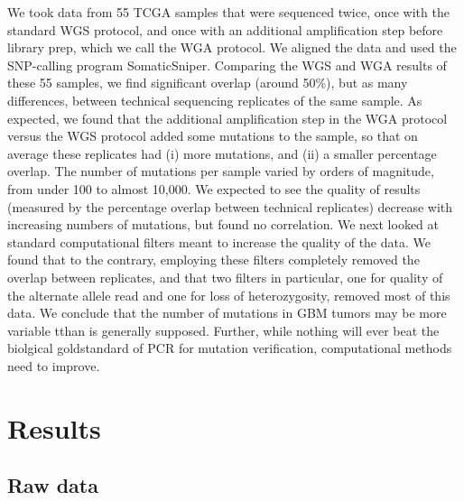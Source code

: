 \documentclass[11pt]{article} %
\begin{document}
We took data from 55 TCGA samples that were sequenced twice, once with the standard WGS protocol, and once with an additional amplification step before library prep, which we call the WGA protocol. We aligned the data and used the SNP-calling program SomaticSniper. Comparing the WGS and WGA results of these 55 samples, we find significant overlap (around 50\%), but as many differences, between technical sequencing replicates of the same sample. As expected, we found that the additional amplification step in the WGA protocol versus the WGS protocol added some mutations to the sample, so that on average these replicates had (i) more mutations, and (ii) a smaller percentage overlap. The number of mutations per sample varied by orders of magnitude, from under 100 to almost 10,000. We expected to see the quality of results (measured by the percentage overlap between technical replicates) decrease with increasing numbers of mutations, but found no correlation. We next looked at standard computational filters meant to increase the quality of the data. We found that to the contrary, employing these filters completely removed the overlap between replicates, and that two filters in particular, one for quality of the alternate allele read and one for loss of heterozygosity, removed most of this data. We conclude that the number of mutations in GBM tumors may be more variable tthan is generally supposed. Further, while nothing will ever beat the biolgical goldstandard of PCR for mutation verification, computational methods need to improve.

\section{Results}

\subsection{Raw data}
\end{document}
